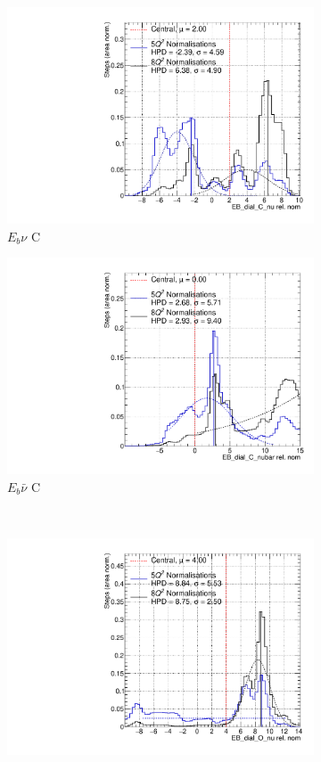 \begin{figure}
\centering
\begin{subfigure}{.48\textwidth}
  \centering
  \includegraphics[width=0.73\linewidth]{figs/Q2_EB_dial_C_nu}
  \caption{$E_{b}\nu$ C}
\end{subfigure}
\begin{subfigure}{.48\textwidth}
  \centering
  \includegraphics[width=0.73\linewidth]{figs/Q2_EB_dial_C_nubar}
  \caption{$E_{b}\bar{\nu}$ C}
\end{subfigure} \\
\begin{subfigure}{.48\textwidth}
  \centering
  \includegraphics[width=0.73\linewidth]{figs/Q2_EB_dial_O_nu}

\end{subfigure}
\end{figure}
